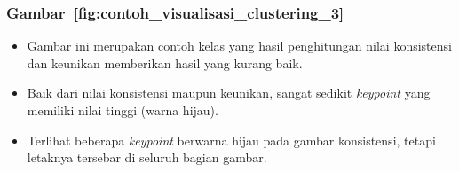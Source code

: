 \subsubsection{Gambar~\ref{fig:contoh_visualisasi_clustering_3}}
\begin{itemize}
	\item Gambar ini merupakan contoh kelas yang hasil penghitungan nilai konsistensi dan keunikan memberikan hasil yang kurang baik. 
	\item Baik dari nilai konsistensi maupun keunikan, sangat sedikit \textit{keypoint} yang memiliki nilai tinggi (warna hijau).
	\item Terlihat beberapa \textit{keypoint} berwarna hijau pada gambar konsistensi, tetapi letaknya tersebar di seluruh bagian gambar.
\end{itemize}


